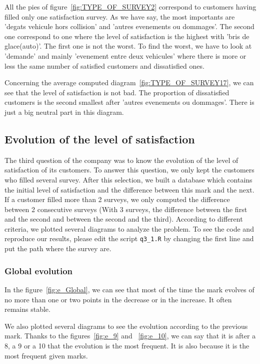 \documentclass[a4paper, 11pt]{article}
\newcommand{\tw}[1]{\texttt{#1}}
\begin{document}
    All the pies of figure~\ref{fig:TYPE_OF_SURVEY2} correspond to customers having filled only one satisfaction survey. As we have say, the most importants are 'degats vehicule hors collision' and 'autres evenements ou dommages'. The second one correspond to one where the level of satisfaction is the highest with 'bris de glace(auto)'. The first one is not the worst. To find the worst, we have to look at 'demande' and mainly 'evenement entre deux vehicules' where there is more or less the same number of satisfied customers and dissatisfied ones.
    
    Concerning the average computed diagram~\ref{fig:TYPE_OF_SURVEY17}, we can see that the level of satisfaction is not bad. The proportion of dissatisfied customers is the second smallest after 'autres evenements ou dommages'. There is just a big neutral part in this diagram.
    
    \subsection{Evolution of the level of satisfaction}
    The third question of the company was to know the evolution of the level of satisfaction of its customers. To answer this question, we only kept the customers who filled several survey. After this selection, we built a database which contains the initial level of satisfaction and the difference between this mark and the next. If a customer filled more than 2 surveys, we only computed the difference between 2 consecutive surveys (With 3 surveys, the difference between the first and the second and between the second and the third). According to different criteria, we plotted several diagrams to analyze the problem. To see the code and reproduce our results, please edit the script \tw{q3\_1.R} by changing the first line and put the path where the survey are.
    
    \subsubsection{Global evolution}
    In the figure~\ref{fig:e_Global}, we can see that most of the time the mark evolves of no more than one or two points in the decrease or in the increase. It often remains stable. 
    
    We also plotted several diagrams to see the evolution according to the previous mark. Thanks to the figures~\ref{fig:e_9} and ~\ref{fig:e_10}, we can say that it is after a 8, a 9 or a 10 that the evolution is the most frequent. It is also because it is the most frequent given marks.
    
\end{document}
